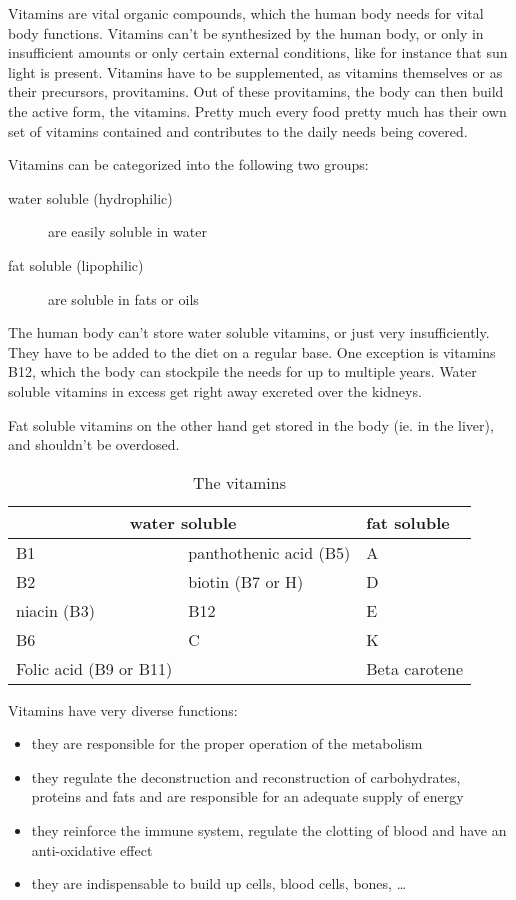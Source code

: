 \documentclass[../main.tex]{subfiles}
\begin{document}
Vitamins are vital organic compounds, which the human body needs for vital body functions.
Vitamins can't be synthesized by the human body, or only in insufficient amounts or only certain external conditions,
like for instance that sun light is present.
Vitamins have to be supplemented, as vitamins themselves or as their precursors, provitamins.
Out of these provitamins, the body can then build the active form, the vitamins.
Pretty much every food pretty much has their own set of vitamins contained and contributes to the daily needs being covered.

Vitamins can be categorized into the following two groups:
\begin{description}
\item[water soluble (hydrophilic)] are easily soluble in water
  \item[fat soluble (lipophilic)] are soluble in fats or oils
  \end{description}

  The human body can't store water soluble vitamins, or just very insufficiently.
  They have to be added to the diet on a regular base.
  One exception is vitamins B12, which the body can stockpile the needs for up to multiple years.
  Water soluble vitamins in excess get right away excreted over the kidneys.

  Fat soluble vitamins on the other hand get stored in the body (ie. in the liver), and shouldn't be overdosed.

  \begin{table}[htb!]
    \centering
    \begin{tabular}[t]{ll|l}
      \multicolumn{2}{c}{\textbf{water soluble}} & \textbf{fat soluble} \\
      \hline
      B1 & panthothenic acid (B5) & A \\
      B2 & biotin (B7 or H) & D \\
      niacin (B3) & B12 & E \\
      B6 & C & K \\
      Folic acid (B9 or B11) & & Beta carotene\\
    \end{tabular}
    \caption{The vitamins}
  \end{table}

  Vitamins have very diverse functions:
  \begin{itemize}
  \item they are responsible for the proper operation of the metabolism
  \item they regulate the deconstruction and reconstruction of carbohydrates, proteins and fats and are responsible for an adequate supply of energy
  \item they reinforce the immune system, regulate the clotting of blood and have an anti-oxidative effect
    \item they are indispensable to build up cells, blood cells, bones, \ldots
    \end{itemize}
\end{document}

